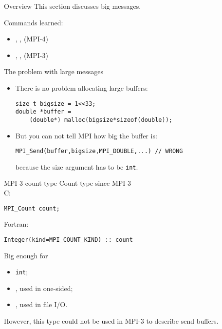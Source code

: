 
\begin{numberedframe}{Overview}
  This section discusses big messages.

  Commands learned:
  \begin{itemize}
  \item {}, ,
     (MPI-4)
  \item {}, ,
     (MPI-3)
  \end{itemize}
\end{numberedframe}

\begin{numberedframe}{The problem with large messages}
  \begin{itemize}
  \item There is no problem allocating large buffers:
\begin{lstlisting}
size_t bigsize = 1<<33;
double *buffer =
    (double*) malloc(bigsize*sizeof(double));
\end{lstlisting}
\item But you can not tell MPI how big the buffer is:
\begin{lstlisting}
MPI_Send(buffer,bigsize,MPI_DOUBLE,...) // WRONG
\end{lstlisting}
because the size argument has to be \lstinline{int}.
  \end{itemize}
\end{numberedframe}

\begin{numberedframe}{MPI 3 count type}
  Count type since MPI 3\\
  C:
\begin{lstlisting}
MPI_Count count;
\end{lstlisting}
Fortran:
\lstset{language=Fortran}
\begin{lstlisting}
Integer(kind=MPI_COUNT_KIND) :: count
\end{lstlisting}
\lstset{language=C}
Big enough for
\begin{itemize}
\item
  \lstinline{int};
\item {}, used in one-sided;
\item {}, used in file I/O.
\end{itemize}
However, this type could not be used in MPI-3 to describe send buffers.
\end{numberedframe}

